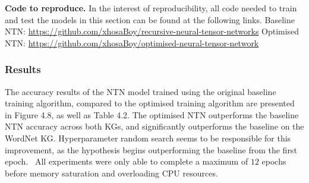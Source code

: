 \noindent \textbf{Code to reproduce.} In the interest of reproducibility, all code needed to train and test the models in this section can be found at the following links. \newline
Baseline NTN: \url{https://github.com/xhosaBoy/recursive-neural-tensor-networks} \newline
Optimised NTN: \url{https://github.com/xhosaBoy/optimised-neural-tensor-network} 

\subsubsection{Results} 
The accuracy results of the NTN model trained using the original baseline training algorithm, compared to the optimised training algorithm are presented in Figure 4.8, as well as Table 4.2. The optimised NTN outperforms the baseline NTN accuracy across both KGs, and significantly outperforms the baseline on the WordNet KG. Hyperparameter random search seems to be responsible for this improvement, as the hypothesis begins outperforming the baseline from the first epoch. \ All experiments were only able to complete a maximum of $ 12 $ epochs before memory saturation and overloading CPU resources. 

\bigskip
\bigskip

